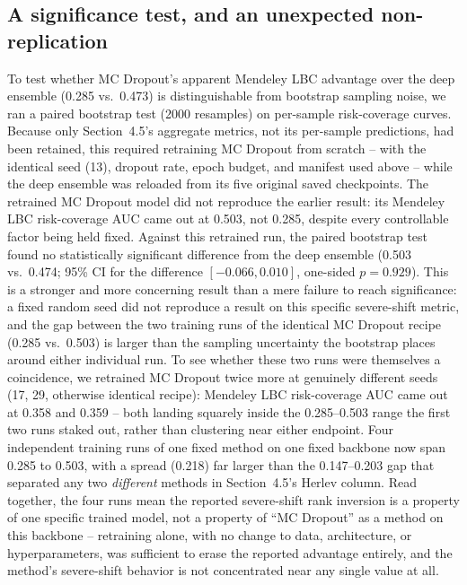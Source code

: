 \documentclass[runningheads]{llncs}
\begin{document}
\subsection{A significance test, and an unexpected non-replication}

To test whether MC Dropout's apparent Mendeley LBC advantage over the deep
ensemble (0.285 vs.\ 0.473) is distinguishable from bootstrap sampling
noise, we ran a paired bootstrap test (2000 resamples) on per-sample
risk-coverage curves. Because only Section~4.5's aggregate metrics, not
its per-sample predictions, had been retained, this required retraining MC
Dropout from scratch -- with the identical seed (13), dropout rate, epoch
budget, and manifest used above -- while the deep ensemble was reloaded
from its five original saved checkpoints. The retrained MC Dropout model
did not reproduce the earlier result: its Mendeley LBC risk-coverage AUC
came out at 0.503, not 0.285, despite every controllable factor being
held fixed. Against this retrained run, the paired bootstrap test found
no statistically significant difference from the deep ensemble (0.503 vs.\
0.474; 95\% CI for the difference $[-0.066, 0.010]$, one-sided
$p=0.929$). This is a stronger and more concerning result than a mere
failure to reach significance: a fixed random seed did not reproduce a
result on this specific severe-shift metric, and the gap between the two
training runs of the identical MC Dropout recipe (0.285 vs.\ 0.503) is
larger than the sampling uncertainty the bootstrap places around either
individual run. To see whether these two runs were themselves a
coincidence, we retrained MC Dropout twice more at genuinely different
seeds (17, 29, otherwise identical recipe): Mendeley LBC risk-coverage AUC
came out at 0.358 and 0.359 -- both landing squarely inside the
0.285--0.503 range the first two runs staked out, rather than clustering
near either endpoint. Four independent training runs of one fixed method
on one fixed backbone now span 0.285 to 0.503, with a spread (0.218) far
larger than the 0.147--0.203 gap that separated any two \emph{different}
methods in Section~4.5's Herlev column. Read together, the four runs mean
the reported severe-shift rank inversion is a property of one specific
trained model, not a property of ``MC Dropout'' as a method on this
backbone -- retraining alone, with no change to data, architecture, or
hyperparameters, was sufficient to erase the reported advantage entirely,
and the method's severe-shift behavior is not concentrated near any
single value at all.
\end{document}
